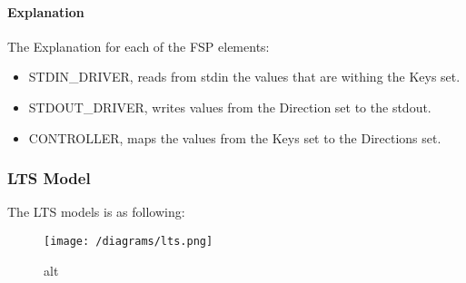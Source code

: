 \hypertarget{explanation}{%
\paragraph{Explanation}\label{explanation}}

The Explanation for each of the FSP elements:

\begin{itemize}
\tightlist
\item
  STDIN\_DRIVER, reads from stdin the values that are withing the Keys
  set.
\item
  STDOUT\_DRIVER, writes values from the Direction set to the stdout.
\item
  CONTROLLER, maps the values from the Keys set to the Directions set.
\end{itemize}

\hypertarget{lts-model}{%
\subsubsection{LTS Model}\label{lts-model}}

The LTS models is as following:

\begin{figure}
\centering
\texttt{[image: /diagrams/lts.png]}
\caption{alt}
\end{figure}
